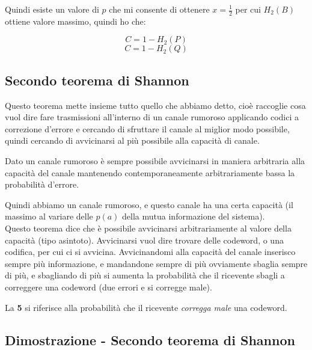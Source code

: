 Quindi esiste un valore di $p$ che mi consente di ottenere $x=\frac12$ per cui $H_2(B)$ ottiene valore massimo, quindi ho che:

\begin{equation*}
C = 1 - H_2(P)
\end{equation*}
\begin{equation*}
C = 1 - H_2(Q)
\end{equation*}

\newpage
\subsection*{Secondo teorema di Shannon}
Questo teorema mette insieme tutto quello che abbiamo detto, cioè raccoglie cosa vuol dire fare trasmissioni all'interno di un canale rumoroso applicando codici a correzione d'errore e cercando di sfruttare il canale al miglior modo possibile, quindi cercando di avvicinarsi al più possibile alla capacità di canale.

\begin{theorem}
	Dato un canale rumoroso è sempre possibile avvicinarsi in maniera arbitraria alla capacità del canale mantenendo contemporaneamente arbitrariamente bassa la probabilità d'errore.
\end{theorem}

Quindi abbiamo un canale rumoroso, e questo canale ha una certa capacità (il massimo al variare delle $p(a)$ della mutua informazione del sistema).\\
Questo teorema dice che è possibile avvicinarsi arbitrariamente al valore della capacità (tipo asintoto). Avvicinarsi vuol dire trovare delle codeword, o una codifica, per cui ci si avvicina.
\medskip
Avvicinandomi alla capacità del canale inserisco sempre più informazione, e mandandone sempre di più ovviamente sbaglia sempre di più, e sbagliando di più si aumenta la probabilità che il ricevente sbagli a correggere una codeword (due errori e si corregge male).

La \textbf{5} si riferisce alla probabilità che il ricevente \textit{corregga male} una codeword.

\subsection*{Dimostrazione - Secondo teorema di Shannon}
